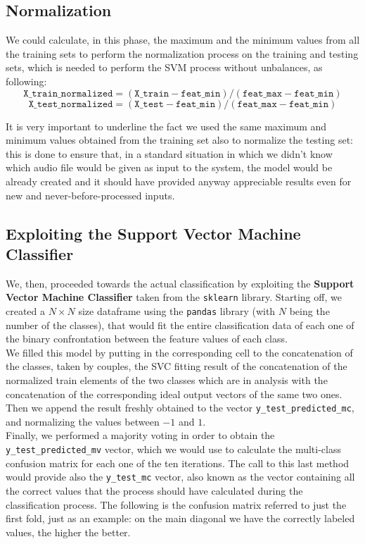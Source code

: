 \documentclass[11pt]{article}
\begin{document}
\subsection{Normalization}
We could calculate, in this phase, the maximum and the minimum values from all the training sets to perform the normalization process on the training and testing sets, which is needed to perform the SVM process without unbalances, as following:
\begin{equation}
\mathtt{X{\_}train{\_}normalized =  (X{\_}train - feat{\_}min) / (feat{\_}max - feat{\_}min)}
\end{equation}
\begin{equation}
\mathtt{X{\_}test{\_}normalized = (X{\_}test - feat{\_}min) / (feat{\_}max - feat{\_}min)}
\end{equation}

It is very important to underline the fact we used the same maximum and minimum values obtained from the training set also to normalize the testing set: this is done to ensure that, in a standard situation in which we didn't know which audio file would be given as input to the system, the model would be already created and it should have provided anyway appreciable results even for new and never-before-processed inputs.

\subsection{Exploiting the Support Vector Machine Classifier}
We, then, proceeded towards the actual classification by exploiting the \textbf{Support Vector Machine Classifier} taken from the \texttt{sklearn} library. Starting off, we created a $N\times N$ size dataframe using the \texttt{pandas} library (with $N$ being the number of the classes), that would fit the entire classification data of each one of the binary confrontation between the feature values of each class.\\
We filled this model by putting in the corresponding cell to the concatenation of the classes, taken by couples, the SVC fitting result of the concatenation of the normalized train elements of the two classes which are in analysis with the concatenation of the corresponding ideal output vectors of the same two ones. Then we append the result freshly obtained to the vector \texttt{y{\_}test{\_}predicted{\_}mc}, and normalizing the values between $-1$ and $1$.\\
Finally, we performed a majority voting in order to obtain the \texttt{y{\_}test{\_}predicted{\_}mv} vector, which we would use to calculate the multi-class confusion matrix for each one of the ten iterations. The call to this last method would provide also the \texttt{y{\_}test{\_}mc} vector, also known as the vector containing all the correct values that the process should have calculated during the classification process. The following is the confusion matrix referred to just the first fold, just as an example: on the main diagonal we have the correctly labeled values, the higher the better.
\end{document}
